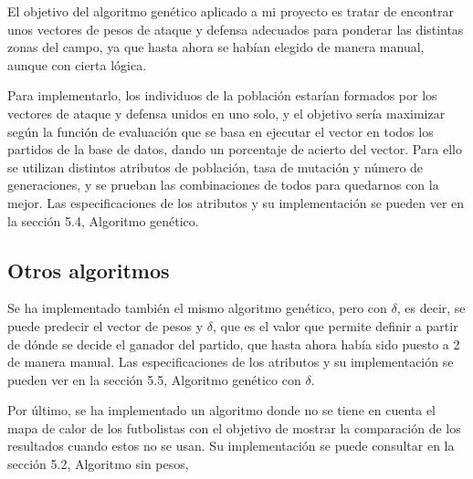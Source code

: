 El objetivo del algoritmo genético aplicado a mi proyecto es tratar de encontrar unos vectores de pesos de ataque y defensa adecuados para ponderar las distintas zonas del campo, ya que hasta ahora se habían elegido de manera manual, aunque con cierta lógica.

Para implementarlo, los individuos de la población estarían formados por los vectores de ataque y defensa unidos en uno solo, y el objetivo sería maximizar según la función de evaluación que se basa en ejecutar el vector en todos los partidos de la base de datos, dando un porcentaje de acierto del vector. Para ello se utilizan distintos atributos de población, tasa de mutación y número de generaciones, y se prueban las combinaciones de todos para quedarnos con la mejor. Las especificaciones de los atributos y su implementación se pueden ver en la sección 5.4, Algoritmo genético.


\subsection*{Otros algoritmos}
Se ha implementado también el mismo algoritmo genético, pero con $\delta$, es decir, se puede predecir el vector de pesos y $\delta$, que es el valor que permite definir a partir de dónde se decide el ganador del partido, que hasta ahora había sido puesto a 2 de manera manual. Las especificaciones de los atributos y su implementación se pueden ver en la sección 5.5, Algoritmo genético con $\delta$.

Por último, se ha implementado un algoritmo donde no se tiene en cuenta el mapa de calor de los futbolistas con el objetivo de mostrar la comparación de los resultados cuando estos no se usan.
Su implementación se puede consultar en la sección 5.2, Algoritmo sin pesos,


